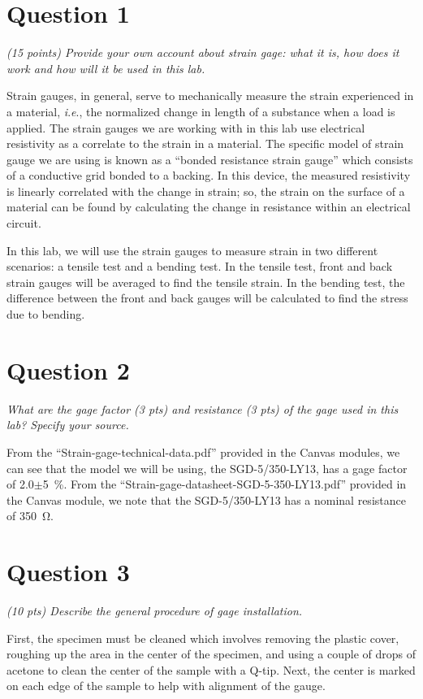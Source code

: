 \documentclass[12 pt]{article}
\newcommand{\ie}{\textit{i}.\textit{e}., }
\begin{document}
\section*{Question 1} \label{question_1}
\textit{(15 points) Provide your own account about strain gage: what it is, how does it work and how will it be used in this lab.}

Strain gauges, in general, serve to mechanically measure the strain experienced in a material, \ie the normalized change in length of a substance when a load is applied. The strain gauges we are working with in this lab use electrical resistivity as a correlate to the strain in a material. The specific model of strain gauge we are using is known as a ``bonded resistance strain gauge'' which consists of a conductive grid bonded to a backing. In this device, the measured resistivity is linearly correlated with the change in strain; so, the strain on the surface of a material can be found by calculating the change in resistance within an electrical circuit.

In this lab, we will use the strain gauges to measure strain in two different scenarios: a tensile test and a bending test. In the tensile test, front and back strain gauges will be averaged to find the tensile strain. In the bending test, the difference between the front and back gauges will be calculated to find the stress due to bending.

\section*{Question 2} \label{question_2}
\textit{What are the gage factor (3 pts) and resistance (3 pts) of the gage used in this lab? Specify your source.}

From the ``Strain-gage-technical-data.pdf'' provided in the Canvas modules, we can see that the model we will be using, the SGD-5/350-LY13, has a gage factor of \num{2.0}$\pm$\qty{5}{\percent}. From the ``Strain-gage-datasheet-SGD-5-350-LY13.pdf'' provided in the Canvas module, we note that the SGD-5/350-LY13 has a nominal resistance of \qty{350}{\ohm}.

\section*{Question 3} \label{question_3}
\textit{(10 pts) Describe the general procedure of gage installation.}

First, the specimen must be cleaned which involves removing the plastic cover, roughing up the area in the center of the specimen, and using a couple of drops of acetone to clean the center of the sample with a Q-tip. Next, the center is marked on each edge of the sample to help with alignment of the gauge.
\end{document}
